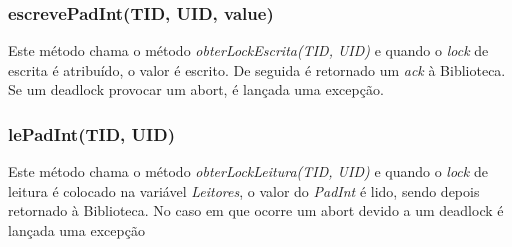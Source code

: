 \subsubsection{escrevePadInt(TID, UID, value)}

Este método chama o método \textit{obterLockEscrita(TID, UID)} e quando o \textit{lock} de escrita é atribuído, o valor é escrito. De seguida é retornado um \textit{ack} à Biblioteca. Se um deadlock provocar um abort, é lançada uma excepção.

\subsubsection{lePadInt(TID, UID)}

Este método chama o método \textit{obterLockLeitura(TID, UID)} e quando o \textit{lock} de leitura é colocado na variável \textit{Leitores}, o valor do \textit{PadInt} é lido, sendo depois retornado à Biblioteca. No caso em que ocorre um abort devido a um deadlock é lançada uma excepção